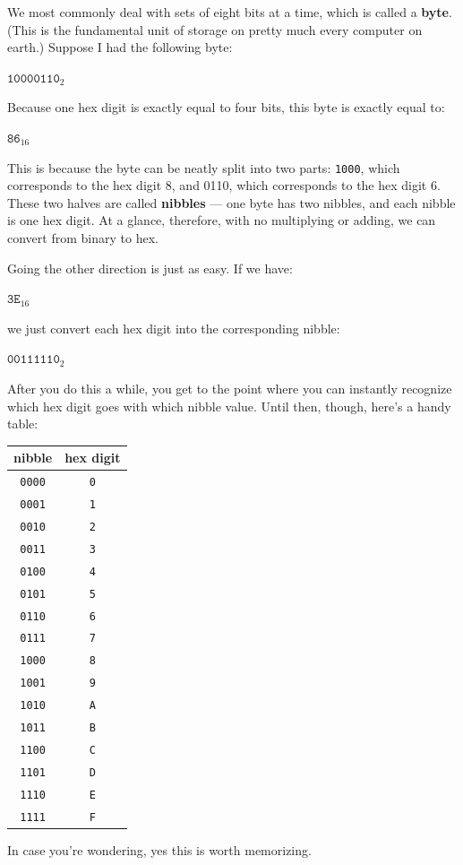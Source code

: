 We most commonly deal with sets of eight bits at a time, which is called a
\textbf{byte}. (This is the fundamental unit of storage on pretty much
every computer on earth.) Suppose I had the following byte:
\begin{center}
{\large
$\texttt{10000110}_2$
}
\end{center}
Because one hex digit is exactly equal to four bits, this byte is exactly
equal to:
\begin{center}
{\large
$\texttt{86}_{16}$
}
\end{center}
This is because the byte can be neatly split into two parts: \texttt{1000},
which corresponds to the hex digit 8, and 0110, which corresponds to the
hex digit 6. These two halves are called \textbf{nibbles} --- one byte has
two nibbles, and each nibble is one hex digit. At a glance, therefore, with
no multiplying or adding, we can convert from binary to hex.

Going the other direction is just as easy. If we have:
\begin{center}
{\large
$\texttt{3E}_{16}$
}
\end{center}
we just convert each hex digit into the corresponding nibble:
\begin{center}
{\large
$\texttt{00111110}_2$
}
\end{center}
After you do this a while, you get to the point where you can instantly
recognize which hex digit goes with which nibble value. Until then, though,
here's a handy table:
\begin{center}
\begin{tabular}{|c|c|}
\hline
nibble & hex digit \\
\hline
\texttt{0000} & \texttt{0} \\
\texttt{0001} & \texttt{1} \\
\texttt{0010} & \texttt{2} \\
\texttt{0011} & \texttt{3} \\
\texttt{0100} & \texttt{4} \\
\texttt{0101} & \texttt{5} \\
\texttt{0110} & \texttt{6} \\
\texttt{0111} & \texttt{7} \\
\texttt{1000} & \texttt{8} \\
\texttt{1001} & \texttt{9} \\
\texttt{1010} & \texttt{A} \\
\texttt{1011} & \texttt{B} \\
\texttt{1100} & \texttt{C} \\
\texttt{1101} & \texttt{D} \\
\texttt{1110} & \texttt{E} \\
\texttt{1111} & \texttt{F} \\
\hline
\end{tabular}
\end{center}
In case you're wondering, yes this is worth memorizing.


